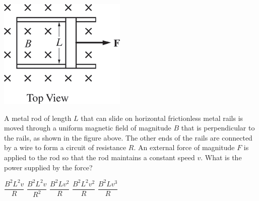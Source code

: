 \begin{center}
\includegraphics[scale=0.5]{images/img-009-029.png}
\end{center}

\begin{questions}\setcounter{question}{31}\question
A metal rod of length $L$ that can slide on horizontal frictionless metal rails is moved through a uniform magnetic field of magnitude $B$ that is perpendicular to the rails, as shown in the figure above. The other ends of the rails are connected by a wire to form a circuit of resistance $R$. An external force of magnitude $F$ is applied to the rod so that the rod maintains a constant speed $v$. What is the power supplied by the force?

\begin{oneparchoices}
\choice $\dfrac{B^{2} L^{2} v}{R}$
\choice $\dfrac{B^{2} L^{2} v}{R^{2}}$
\choice $\dfrac{B^{2} L v^{2}}{R}$
\choice $\dfrac{B^{2} L^{2} v^{2}}{R}$
\choice $\dfrac{B^{2} L v^{3}}{R}$
\end{oneparchoices}\end{questions}

